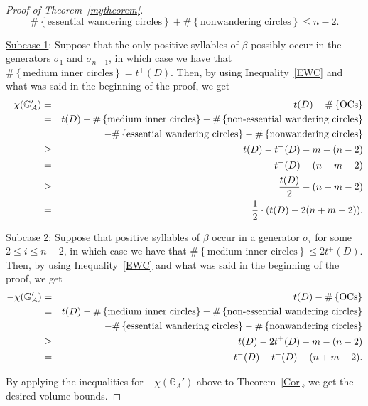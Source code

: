 \documentclass{article}
\begin{document}
\begin{proof}[Proof of Theorem~\ref{mytheorem}]
\begin{equation}\label{EWC}
\#\left\{\text{essential\ wandering\ circles}\right\}+\#\left\{\text{nonwandering\ circles}\right\} \leq n-2.
\end{equation}

\bigskip

\noindent \underline{Subcase 1}: Suppose that the only positive syllables of $\beta$ possibly occur in the generators $\sigma_{1}$ and $\sigma_{n-1}$, in which case we have that $\#\left\{\text{medium\ inner\ circles}\right\} = t^{+}(D)$. Then, by using Inequality~\ref{EWC} and what was said in the beginning of the proof, we get
\begin{eqnarray*}-\chi(\mathbb{G}_{A}') & = & t(D)-\#\left\{\text{OCs}\right\}\\
\ & = & t(D)-\#\left\{\text{medium\ inner\ circles}\right\}-\#\left\{\text{non-essential\ wandering\ circles}\right\}\\
\ & \ & \hspace{.318in} -\#\left\{\text{essential\ wandering\ circles}\right\}-\#\left\{\text{nonwandering\ circles}\right\}\\
\ & \geq & t(D)-t^{+}(D)-m-(n-2)\\
\ & = & t^{-}(D)-(n+m-2)\\
\ & \geq & \frac{t(D)}{2}-(n+m-2)\\
\ & = & \frac{1}{2}\cdot (t(D)-2(n+m-2)).
\end{eqnarray*}

\noindent \underline{Subcase 2}: Suppose that positive syllables of $\beta$ occur in a generator $\sigma_{i}$ for some $2 \leq i \leq n-2$, in which case we have that $\#\left\{\text{medium\ inner\ circles}\right\} \leq 2t^{+}(D)$. Then, by using Inequality~\ref{EWC} and what was said in the beginning of the proof, we get
\begin{eqnarray*}-\chi(\mathbb{G}_{A}') & = & t(D)-\#\left\{\text{OCs}\right\}\\
\ & = & t(D)-\#\left\{\text{medium\ inner\ circles}\right\}-\#\left\{\text{non-essential\ wandering\ circles}\right\}\\
\ & \ & \hspace{.318in} -\#\left\{\text{essential\ wandering\ circles}\right\}-\#\left\{\text{nonwandering\ circles}\right\}\\
\ & \geq & t(D)-2t^{+}(D)-m-(n-2)\\
\ & = & t^{-}(D)-t^{+}(D)-(n+m-2).\\
\end{eqnarray*}

\noindent By applying the inequalities for $-\chi(\mathbb{G}_{A}')$ above to Theorem~\ref{Cor}, we get the desired volume bounds.

\end{proof}
\end{document}

